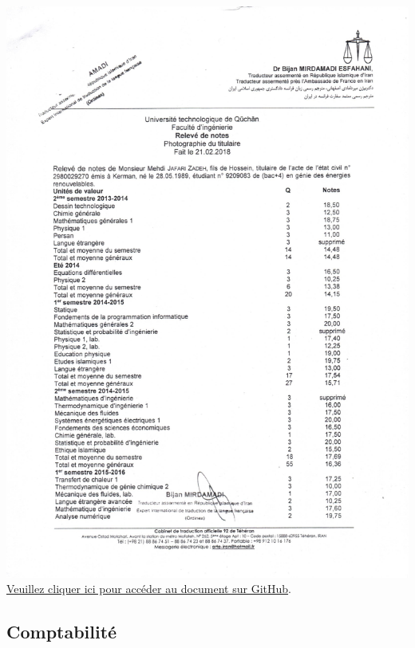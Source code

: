 \documentclass{article}
\begin{document}
    \begin{center}
        \includegraphics[width=\textwidth,height=\textheight,keepaspectratio]{../Document/Education/Renewable Energy Engineering/21-02-2018 releve de notes - Génie énergétique - P01.jpg}
        \footnotesize
         \href{https://github.com/jafarizadeh/CV---lettre/tree/079f60796b41475881d7ba4a70abc3254d3dd466/Document/Education/Renewable%20Energy%20Engineering}{Veuillez cliquer ici pour accéder au document sur GitHub}.
    \end{center}
    
\newpage

 
    \subsection{Comptabilité}
    
\end{document}
